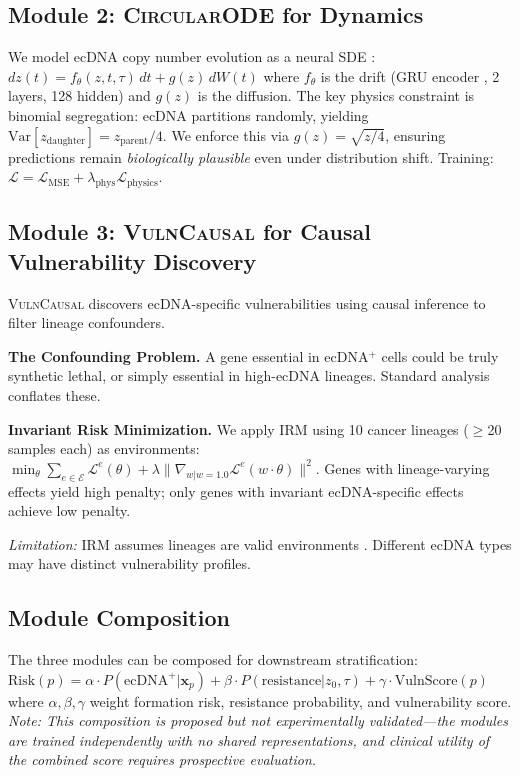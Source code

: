 \documentclass[sigconf,anonymous]{acmart}
\newcommand{\circularode}{\textsc{CircularODE}}
\newcommand{\vulncausal}{\textsc{VulnCausal}}
\begin{document}
\subsection{Module 2: \circularode{} for Dynamics}
\label{sec:dynamics}

We model ecDNA copy number evolution as a neural SDE \cite{li_2020_neuralsde}:
$dz(t) = f_\theta(z, t, \tau) \, dt + g(z) \, dW(t)$
where $f_\theta$ is the drift (GRU encoder \cite{cho_2014_gru}, 2 layers, 128 hidden) and $g(z)$ is the diffusion. The key physics constraint is binomial segregation: ecDNA partitions randomly, yielding $\text{Var}[z_{\text{daughter}}] = z_{\text{parent}}/4$. We enforce this via $g(z) = \sqrt{z/4}$, ensuring predictions remain \textit{biologically plausible} even under distribution shift. Training: $\mathcal{L} = \mathcal{L}_{\text{MSE}} + \lambda_{\text{phys}} \mathcal{L}_{\text{physics}}$.

\subsection{Module 3: \vulncausal{} for Causal Vulnerability Discovery}
\label{sec:vulnerability}

\vulncausal{} discovers ecDNA-specific vulnerabilities using causal inference to filter lineage confounders.

\textbf{The Confounding Problem.} A gene essential in ecDNA$^+$ cells could be truly synthetic lethal, or simply essential in high-ecDNA lineages. Standard analysis conflates these.

\textbf{Invariant Risk Minimization.} We apply IRM \cite{arjovsky_2019_irm} using 10 cancer lineages ($\geq$20 samples each) as environments:
$\min_\theta \sum_{e \in \mathcal{E}} \mathcal{L}^e(\theta) + \lambda \|\nabla_{w|w=1.0} \mathcal{L}^e(w \cdot \theta)\|^2$.
Genes with lineage-varying effects yield high penalty; only genes with invariant ecDNA-specific effects achieve low penalty.

\textit{Limitation:} IRM assumes lineages are valid environments \cite{rosenfeld_2021_irm_risks}. Different ecDNA types may have distinct vulnerability profiles.

\subsection{Module Composition}
\label{sec:integration}

The three modules can be composed for downstream stratification:
$\text{Risk}(p) = \alpha \cdot P(\text{ecDNA}^+ | \mathbf{x}_p) + \beta \cdot P(\text{resistance} | z_0, \tau) + \gamma \cdot \text{VulnScore}(p)$
where $\alpha, \beta, \gamma$ weight formation risk, resistance probability, and vulnerability score. \textit{Note: This composition is proposed but not experimentally validated---the modules are trained independently with no shared representations, and clinical utility of the combined score requires prospective evaluation.}
\end{document}

